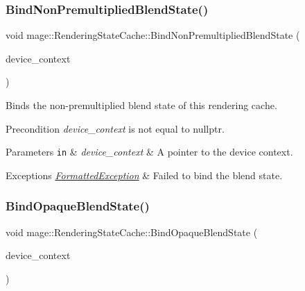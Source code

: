 \subsubsection{\texorpdfstring{Bind\+Non\+Premultiplied\+Blend\+State()}{BindNonPremultipliedBlendState()}}
{\footnotesize\ttfamily void mage\+::\+Rendering\+State\+Cache\+::\+Bind\+Non\+Premultiplied\+Blend\+State (\begin{DoxyParamCaption}\item[{I\+D3\+D11\+Device\+Context2 $\ast$}]{device\+\_\+context }\end{DoxyParamCaption})}

Binds the non-\/premultiplied blend state of this rendering cache.

\begin{DoxyPrecond}{Precondition}
{\itshape device\+\_\+context} is not equal to {\ttfamily nullptr}. 
\end{DoxyPrecond}

\begin{DoxyParams}[1]{Parameters}
\mbox{\tt in}  & {\em device\+\_\+context} & A pointer to the device context. \\
\hline
\end{DoxyParams}

\begin{DoxyExceptions}{Exceptions}
{\em \hyperlink{structmage_1_1_formatted_exception}{Formatted\+Exception}} & Failed to bind the blend state. \\
\hline
\end{DoxyExceptions}
\hypertarget{structmage_1_1_rendering_state_cache_a2844150e11df2527cb5cc22570140c3a}{}\label{structmage_1_1_rendering_state_cache_a2844150e11df2527cb5cc22570140c3a} 
\subsubsection{\texorpdfstring{Bind\+Opaque\+Blend\+State()}{BindOpaqueBlendState()}}
{\footnotesize\ttfamily void mage\+::\+Rendering\+State\+Cache\+::\+Bind\+Opaque\+Blend\+State (\begin{DoxyParamCaption}\item[{I\+D3\+D11\+Device\+Context2 $\ast$}]{device\+\_\+context }\end{DoxyParamCaption})}

